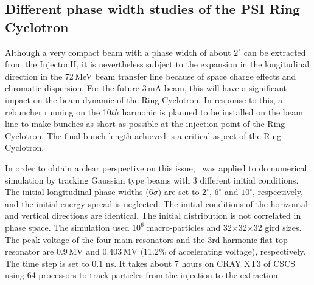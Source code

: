 \documentclass[aps,prstab,onecolumn,superscriptaddress,showpacs]{revtex4}
\begin{document}
\subsection{Different phase width studies of the PSI Ring Cyclotron}

Although a very compact beam with a phase width of about $2^\circ$ can be extracted from the Injector\,II, it is nevertheless subject to the expansion in the longitudinal direction in the 72\,MeV 
beam transfer line because of space charge effects and chromatic dispersion. For the future 3\,mA beam, this will have a significant impact on the beam dynamic of the Ring Cyclotron.
In response to this, a rebuncher running on the 10$th$ harmonic is planned to be installed on the beam line to make bunches as short as possible at the injection point of the Ring Cyclotron.
The final bunch length achieved is a critical aspect of the Ring Cyclotron.

In order to obtain a clear perspective on this issue, \opalcycl \  was applied to do numerical simulation by tracking Gaussian type beams with 3
different initial conditions. The initial longitudinal phase widths (6$\sigma$) are set to $2^\circ$, $6^\circ$ and $10^\circ$, respectively,
and the initial energy spread is neglected.
The initial conditions of the horizontal and vertical directions are identical. 
The initial distribution is not correlated in phase space.
The simulation used $10^6$ macro-particles and 32$\times$32$\times$32 gird sizes. The peak voltage of the four main resonators and the 3rd harmonic flat-top resonator are 0.9\,MV and
0.403\,MV (11.2\% of accelerating voltage), respectively. The time step is set to 0.1 ns. It takes about 7 hours on CRAY XT3 of CSCS using 64 processors to track particles from the 
injection to the extraction.
\end{document}
